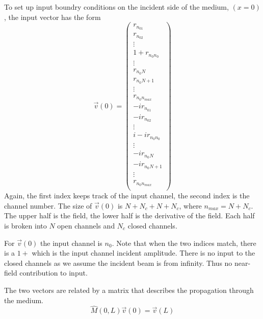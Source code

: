 To set up input boundry conditions on the incident side of the medium, $(x=0)$, the input vector has the form
\begin{equation}
\vec{v}(0) = 
\left( \begin{array}{c}
r_{n_01} \\     %
r_{n_02} \\     %
\vdots \\       %
1+r_{n_0n_0} \\	%
\vdots \\       %
r_{n_0N} \\     %
r_{n_0N+1} \\   %
\vdots \\       %
r_{n_0n_{max}}\\ %
-i r_{n_01} \\  %
-i r_{n_02} \\  %
\vdots \\       %
i - i r_{n_0n_0} \\ %
\vdots \\       %
-i r_{n_0N} \\  %
-i r_{n_0N+1} \\ %
\vdots \\       %
r_{n_0n_{max}} \\ %
\end{array} \right)
\label{incidentsidevector}
\end{equation}
Again, the first index keeps track of the input channel, the second index is the channel number. The size of $\vec{v}(0)$ is $N+N_c+N+N_c$, where $n_{max} = N+N_c$.  The upper half is the field, the lower half is the derivative of the field.  Each half is broken into $N$ open channels and $N_c$ closed channels.

For $\vec{v}(0)$ the input channel is $n_0$. Note that when the two indices match, there is a $1+$ which is the input channel incident amplitude.  There is no input to the closed channels as we assume the incident beam is from infinity. Thus no near-field contribution to input.  

The two vectors are related by a matrix that describes the propagation through the medium.
\begin{equation}
\hat{M}(0,L) \vec{v}(0) = \vec{v}(L)
\end{equation}

